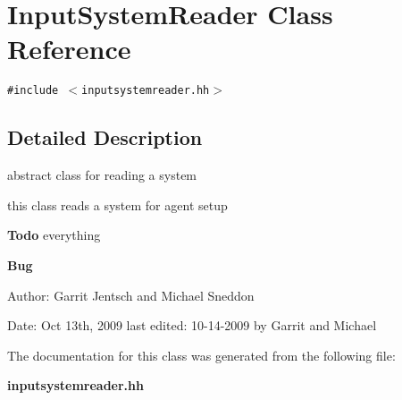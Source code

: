 \section{InputSystemReader Class Reference}
\label{classInputSystemReader}
{\tt \#include $<$inputsystemreader.hh$>$}



\subsection{Detailed Description}
abstract class for reading a system 

this class reads a system for agent setup

\begin{Desc}
\item[{\bf Todo}]everything\end{Desc}
\begin{Desc}
\item[{\bf Bug}]\end{Desc}
\begin{Desc}
\item[Author:]Garrit Jentsch and Michael Sneddon\end{Desc}
\begin{Desc}
\item[Date:]Oct 13th, 2009 last edited: 10-14-2009 by Garrit and Michael \end{Desc}


The documentation for this class was generated from the following file:\begin{CompactItemize}
\item 
{\bf inputsystemreader.hh}\end{CompactItemize}
